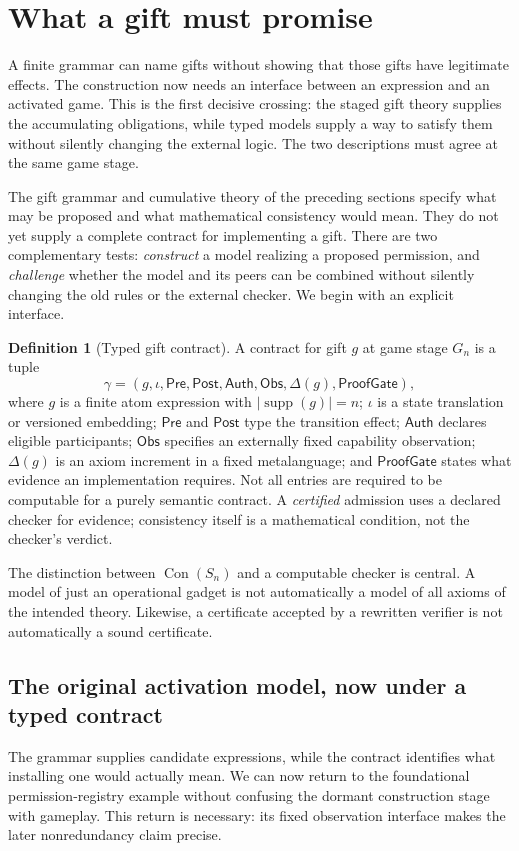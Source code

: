 \documentclass[11pt,letterpaper]{article}
\theoremstyle{definition}\newtheorem{definition}[theorem]{Definition}\newtheorem{example}[theorem]{Example}
\theoremstyle{remark}\newtheorem{remark}[theorem]{Remark}
\newcommand{\Con}{\operatorname{Con}}
\newcommand{\Supp}{\operatorname{supp}}
\begin{document}
\section{What a gift must promise}\label{sec:typed-braid}
A finite grammar can name gifts without showing that those gifts have
legitimate effects. The construction now needs an interface between an
expression and an activated game. This is the first decisive crossing:
the staged gift theory supplies the accumulating obligations, while typed
models supply a way to satisfy them without silently changing the external
logic. The two descriptions must agree at the same game stage.

The gift grammar and cumulative theory of the preceding sections specify what may be proposed and what mathematical consistency would mean. They do not yet supply a complete contract for implementing a gift. There are two complementary tests: \emph{construct} a model realizing a proposed permission, and \emph{challenge} whether the model and its peers can be combined without silently changing the old rules or the external checker. We begin with an explicit interface.


\begin{definition}[Typed gift contract]\label{w1:def:contract}
A contract for gift $g$ at game stage $G_n$ is a tuple
\[
 \gamma=(g,\iota,\mathsf{Pre},\mathsf{Post},\mathsf{Auth},\mathsf{Obs},\Delta(g),\mathsf{ProofGate}),
\]
where $g$ is a finite atom expression with $|\Supp(g)|=n$; $\iota$ is a state translation or versioned embedding; $\mathsf{Pre}$ and $\mathsf{Post}$ type the transition effect; $\mathsf{Auth}$ declares eligible participants; $\mathsf{Obs}$ specifies an externally fixed capability observation; $\Delta(g)$ is an axiom increment in a fixed metalanguage; and $\mathsf{ProofGate}$ states what evidence an implementation requires. Not all entries are required to be computable for a purely semantic contract. A \emph{certified} admission uses a declared checker for evidence; consistency itself is a mathematical condition, not the checker's verdict.
\end{definition}

The distinction between $\Con(S_n)$ and a computable checker is central. A model of just an operational gadget is not automatically a model of all axioms of the intended theory. Likewise, a certificate accepted by a rewritten verifier is not automatically a sound certificate.



\subsection{The original activation model, now under a typed contract}
The grammar supplies candidate expressions, while the contract identifies what installing one
would actually mean.  We can now return to the foundational permission-registry example
without confusing the dormant construction stage with gameplay.  This return is necessary:
its fixed observation interface makes the later nonredundancy claim precise.
\end{document}

